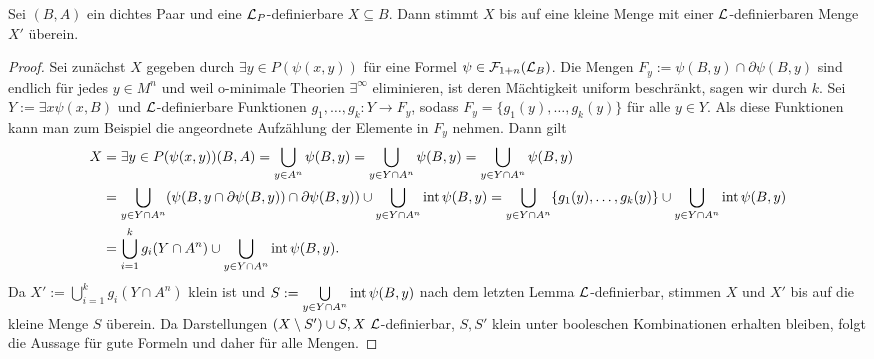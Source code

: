 \begin{lemma}
	Sei $(B,A)$ ein dichtes Paar und eine $\mathcal{L}_P$-definierbare $X\subseteq B$. Dann stimmt $X$ bis auf eine kleine Menge mit einer $\mathcal{L}$-definierbaren Menge $X'$ überein.
\end{lemma}
\begin{proof}
	Sei zunächst $X$ gegeben durch $\exists y\in P(\psi(x,y))$ für eine Formel $\psi\in\mathcal{F}_{1+n}(\mathcal{L}_B)$. Die Mengen $F_y:=\psi(B,y)\cap\partial\psi(B,y)$ sind endlich für jedes $y\in M^n$ und weil o-minimale Theorien $\exists^\infty$ eliminieren, ist deren Mächtigkeit uniform beschränkt, sagen wir durch $k$. Sei $Y:=\exists x\psi(x,B)$ und $\mathcal{L}$-definierbare Funktionen $g_1,\dots,g_k:Y\rightarrow F_y$, sodass $F_y=\{g_1(y),\dots,g_k(y)\}$ für alle $y\in Y$. Als diese Funktionen kann man zum Beispiel die angeordnete Aufzählung der Elemente in $F_y$ nehmen. Dann gilt
	\begin{align*}
	X&=\exists y\in P(\psi(x,y))(B,A)=\bigcup\limits_{y\in A^n}\psi(B,y)=\bigcup\limits_{y\in Y\cap A^n}\psi(B,y)=\bigcup\limits_{y\in Y\cap A^n}\psi(B,y)\\&=\bigcup\limits_{y\in Y\cap A^n}(\psi(B,y\cap \partial\psi(B,y))\cap \partial\psi(B,y))\cup\bigcup\limits_{y\in Y\cap A^n}\operatorname{int}\psi(B,y)=\bigcup\limits_{y\in Y\cap A^n}\{g_1(y),\dots,g_k(y)\}\cup\bigcup\limits_{y\in Y\cap A^n}\operatorname{int}\psi(B,y)\\&=\bigcup\limits_{i=1}^kg_i(Y\cap A^n)\cup \bigcup\limits_{y\in Y\cap A^n}\operatorname{int}\psi(B,y).
	\end{align*}
	Da $X':=\bigcup\limits_{i=1}^kg_i(Y\cap A^n)$ klein ist und $S:=\bigcup\limits_{y\in Y\cap A^n}\operatorname{int}\psi(B,y)$ nach dem letzten Lemma $\mathcal{L}$-definierbar, stimmen $X$ und $X'$ bis auf die kleine Menge $S$ überein. Da Darstellungen \glqq{}$(X\setminus  S')\cup S,X\ \lingua$-definierbar, $S,S'$ klein\grqq{} unter booleschen Kombinationen erhalten bleiben, folgt die Aussage für gute Formeln und daher für alle Mengen.
\end{proof}